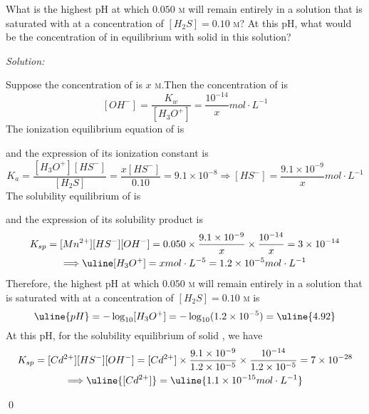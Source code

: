 \documentclass[12pt]{article}
\newenvironment{problem}[2][Problem]{\begin{trivlist}
\item[\hskip \labelsep {\bfseries #1}\hskip \labelsep {\bfseries #2.}]}{\end{trivlist}}
\newenvironment{sol}
    {\emph{Solution:}
    }
    {
    \qed
    }
\begin{document}
\begin{problem}{16.56}
What is the highest pH at which $0.050$ \textsc{m}  will remain entirely in a solution that is saturated with  at a concentration of $[H_2S]=0.10$ \textsc{m}? At this pH, what would be the concentration of  in equilibrium with solid  in this solution?
\end{problem}
\begin{sol}
Suppose the concentration of \ce[H3O+] is $x$ \textsc{m}.Then the concentration of  is
\[
[OH^-]=\frac{K_w}{[H_3O^+]}=\frac{10^{-14}}{x}mol\cdot L^{-1}
\]
The ionization equilibrium equation of  is
\begin{center}
\end{center}
and the expression of its ionization constant is
\[
K_a=\frac{[H_3O^+][HS^-]}{[H_2S]}=\frac{x[HS^-]}{0.10}=9.1\times10^{-8}\Longrightarrow[HS^-]=\frac{9.1\times10^{-9}}{x}mol\cdot L^{-1}
\]
The solubility equilibrium of  is
\begin{center}
\end{center}
and the expression of its solubility product is
\begin{gather*}
K_{sp}=[Mn^{2+}][HS^-][OH^-]=0.050\times\frac{9.1\times10^{-9}}{x}\times\frac{10^{-14}}{x}=3\times10^{-14}\\
\Longrightarrow\uline[H_3O^+]=xmol\cdot L^{-5}=1.2\times10^{-5}mol\cdot L^{-1}
\end{gather*}
Therefore, the highest pH at which $0.050$ \textsc{m}  will remain entirely in a solution that is saturated with  at a concentration of $[H_2S]=0.10$ \textsc{m} is
\[
\uline{pH}=-\log_{10}[H_3O^+]=-\log_{10}(1.2\times10^{-5})=\uline{4.92}
\]
At this pH, for the solubility equilibrium of solid , we have
\begin{gather*}
K_{sp}=[Cd^{2+}][HS^-][OH^-]=[Cd^{2+}]\times\frac{9.1\times10^{-9}}{1.2\times10^{-5}}\times\frac{10^{-14}}{1.2\times10^{-5}}=7\times10^{-28}\\
\Longrightarrow\uline{[Cd^{2+}]}=\uline{1.1\times10^{-15}mol\cdot L^{-1}}
\end{gather*}
\end{sol}
\end{document}
